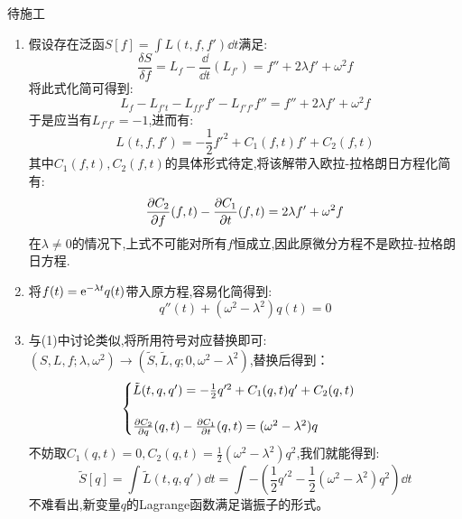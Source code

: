 \begin{solution}
    待施工
\end{solution}

\begin{solution}
    \begin{enumerate}[label=(\arabic*)]
        \item 假设存在泛函\(S[f]=\int L(t,f,f') \dd t\)满足:
        \[
        \frac{\delta S}{\delta f}=L_f-\frac{\dd}{\dd t}(L_{f'})=f''+2\lambda f'+\omega^2 f
        \]
        将此式化简可得到:
        \[
        L_f-L_{f't}-L_{ff'}f'-L_{f'f'}f''=f''+2\lambda f'+\omega^2 f
        \]
        于是应当有\(L_{f'f'}=-1\),进而有:
        \[
        L(t,f,f')=-\frac12f'^2+C_1(f,t)f'+C_2(f,t)
        \]
        其中\(C_1(f,t),C_2(f,t)\)的具体形式待定,将该解带入欧拉-拉格朗日方程化简有:
        \[
        \frac{\partial C_2}{\partial f}(f,t)-\frac{\partial C_1}{\partial t}(f,t)=2\lambda f'+\omega^2f
        \]
        在\(\lambda\neq 0\)的情况下,上式不可能对所有\(f\)恒成立,因此原微分方程不是欧拉-拉格朗日方程.
        \item 将\(f(t)=\mathrm e ^{-\lambda t}q(t)\)带入原方程,容易化简得到:\[
        q''(t)+(\omega^2 - \lambda^2)q(t)=0
        \]
        \item 与(1)中讨论类似,将所用符号对应替换即可:\((S,L,f;\lambda,\omega^2)\rightarrow(\tilde{S},\tilde{L},q;0,\omega^2-\lambda^2)\),替换后得到：
        \[
        \begin{cases}
            \tilde{L}(t,q,q')=-\frac12q'^2+C_1(q,t)q'+C_2(q,t)\\
            \\
            \frac{\partial C_2}{\partial q}(q,t)-\frac{\partial C_1}{\partial t}(q,t)=(\omega^2-\lambda^2)q
        \end{cases}
        \]
        不妨取\(C_1(q,t)=0,C_2(q,t)=\frac12(\omega^2-\lambda^2)q^2\),我们就能得到:
        \[
        \tilde{S}[q]=\int\tilde{L}(t,q,q')\dd t=\int-\left( 
            \frac12q'^2-\frac12(\omega^2-\lambda^2)q^2
        \right)\dd t
        \]
        不难看出,新变量\(q\)的Lagrange函数满足谐振子的形式。
    \end{enumerate}
\end{solution}

